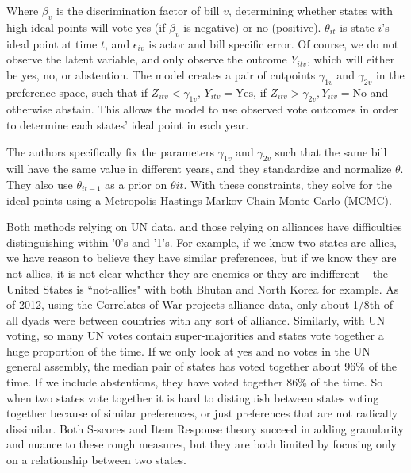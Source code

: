 \noindent Where $\beta_{v}$ is the discrimination factor of bill $v$, determining whether states with high ideal points will vote yes (if $\beta_{v}$ is negative) or no (positive). $\theta_{it}$ is state $i$'s ideal point at time $t$, and $\epsilon_{iv}$ is actor and bill specific error. Of course, we do not observe the latent variable, and only observe the outcome $Y_{itv}$, which will either be yes, no, or abstention. The model creates a pair of cutpoints $\gamma_{1v}$ and $\gamma_{2v}$ in the preference space, such that  if $Z_{itv} < \gamma_{1v}$, $Y_{itv} = \text{Yes}$, if $Z_{itv} > \gamma_{2v}, Y_{itv} = \text{No}$ and otherwise abstain. This allows the model to use observed vote outcomes in order to determine each states' ideal point in each year.

The authors specifically fix the parameters $\gamma_{1v}$ and $\gamma_{2v}$ such that the same bill will have the same value in different years, and they standardize and normalize $\theta$. They also use $\theta_{it-1}$ as a prior on $\theta{it}$. With these constraints, they solve for the ideal points using a Metropolis Hastings Markov Chain Monte Carlo (MCMC).

Both methods relying on UN data, and those relying on alliances have difficulties distinguishing within '0's and '1's. For example, if we know two states are allies, we have reason to believe they have similar preferences, but if we know they are not allies, it is not clear whether they are enemies or they are indifferent -- the United States is ``not-allies" with both Bhutan and North Korea for example. As of 2012, using the Correlates of War projects alliance data, only about 1/8th of all dyads were between countries with any sort of alliance. Similarly, with UN voting, so many UN votes contain super-majorities and states vote together a huge proportion of the time. If we only look at yes and no votes in the UN general assembly, the median pair of states has voted together about 96\% of the time. If we include abstentions,  they have voted together 86\% of the time. So when two states vote together it is hard to distinguish between states voting together because of similar preferences, or just preferences that are not radically dissimilar. Both S-scores and Item Response theory succeed in adding granularity and nuance to these rough measures, but they are both limited by focusing only on a relationship between two states. 

